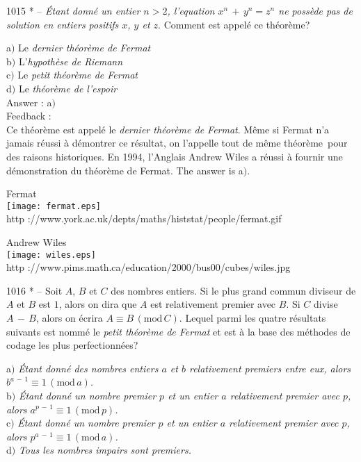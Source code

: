 ﻿\documentclass[letterpaper, 12pt]{article}
\begin{document}
1015 * -- {\sl \'Etant donn\'e un entier $n>2$, l'equation
$x^n\,+\,y^n=z^n$ ne poss\`ede pas de solution en entiers positifs
$x$, $y$ et $z$}. Comment est appel\'e ce th\'eor\`eme?

a$)$ Le {\sl dernier th\'eor\`eme de Fermat} \\
b$)$ L'{\sl hypoth\`ese de Riemann} \\
c$)$ Le {\sl petit th\'eor\`eme de Fermat} \\
d$)$ Le {\sl th\'eor\`eme de l'espoir}\\

Answer : a$)$\\

Feedback : \\
Ce th\'eor\`eme est appel\'e le {\sl dernier th\'eor\`eme de
Fermat}. M\^eme si Fermat n'a jamais r\'eussi \`a d\'emontrer ce
r\'esultat, on l'appelle tout de m\^eme \og th\'eor\`eme\fg\ pour
des raisons historiques. En 1994, l'Anglais Andrew Wiles a r\'eussi
\`a fournir une d\'emonstration du th\'eor\`eme de Fermat.
The answer is a$)$.\\

        \begin{center}
        Fermat\\
    \texttt{[image: fermat.eps]}\\
        {\footnotesize http
://www.york.ac.uk/depts/maths/histstat/people/fermat.gif}
    \end{center}

        \begin{center}
        Andrew Wiles\\
    \texttt{[image: wiles.eps]}\\
        {\footnotesize http
://www.pims.math.ca/education/2000/bus00/cubes/wiles.jpg}
    \end{center}

1016 * -- Soit $A$, $B$ et $C$ des nombres entiers. Si le plus grand
commun diviseur de $A$ et $B$ est $1$, alors on dira que $A$ est
relativement premier avec $B$. Si $C$ divise $A\,-\,B$, alors on
\'ecrira $A\equiv B\,(\mathrm{mod}\,C)$. Lequel parmi les quatre
r\'esultats suivants est nomm\'e le {\sl petit th\'eor\`eme de
Fermat} et est \`a la base des m\'ethodes de codage les plus
perfectionn\'ees?

a$)$ {\sl \'Etant donn\'e des nombres entiers $a$ et $b$ relativement
premiers entre eux, alors $b^{a\,-\,1}\equiv1\,(\mathrm{mod}\,a)$.} \\
b$)$ {\sl \'Etant donn\'e un nombre premier $p$ et un entier $a$
relativement premier avec $p$, alors
$a^{p\,-\,1}\equiv1\,(\mathrm{mod}\,p)$.} \\
c$)$ {\sl \'Etant donn\'e un nombre premier $p$ et un entier $a$
relativement premier avec $p$, alors
$p^{a\,-\,1}\equiv1\,(\mathrm{mod}\,a)$.} \\
d$)$ {\sl Tous les nombres impairs sont premiers.}\\
\end{document}
